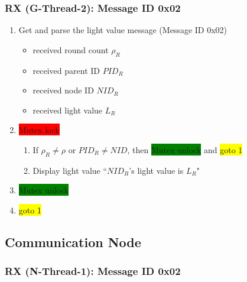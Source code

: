 \documentclass[letterpaper,10pt]{article}
\begin{document}
\subsubsection{RX (G-Thread-2): Message ID 0x02}

\begin{enumerate}
	\item Get and parse the light value message (Message ID 0x02)
	\begin{itemize}
		\item received round count $\rho_R$
		\item received parent ID $PID_R$
		\item received node ID $NID_R$
		\item received light value $L_R$
	\end{itemize}
	\item \colorbox{red}{Mutex lock}
	\begin{enumerate}
		\item If $\rho_R \neq \rho$ or $PID_R \neq NID$, then \colorbox{green}{Mutex unlock} and \colorbox{yellow}{goto 1}
		\item Display light value ``$NID_R$'s light value is $L_R$"
	\end{enumerate}
	\item \colorbox{green}{Mutex unlock}
	\item \colorbox{yellow}{goto 1}
\end{enumerate}

\subsection{Communication Node}

\subsubsection{RX (N-Thread-1): Message ID 0x02}
\end{document}
